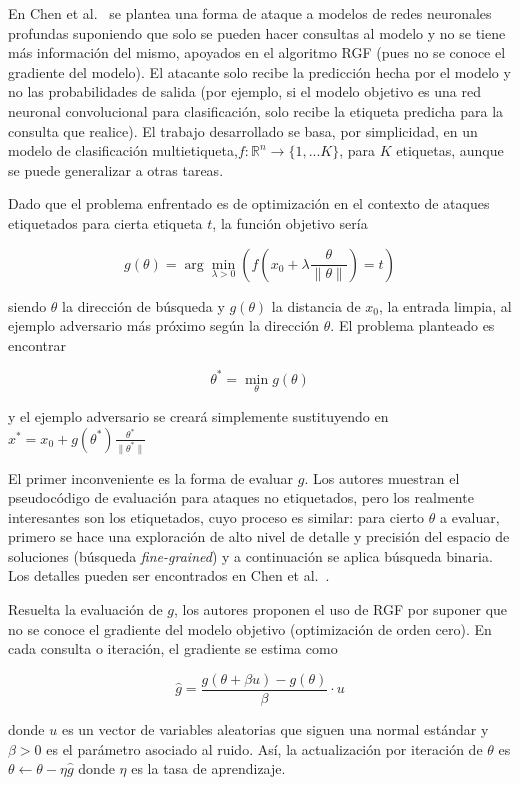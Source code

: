 En Chen et al.~\cite{RGF} se plantea una forma de ataque a modelos de redes neuronales profundas suponiendo que solo se pueden hacer consultas al modelo y no se tiene más información del mismo, apoyados en el algoritmo RGF (pues no se conoce el gradiente del modelo). El atacante solo recibe la predicción hecha por el modelo y no las probabilidades de salida (por ejemplo, si el modelo objetivo es una red neuronal convolucional para clasificación, solo recibe la etiqueta predicha para la consulta que realice). El trabajo desarrollado se basa, por simplicidad, en un modelo de clasificación multietiqueta,$f:\mathbb{R}^n \to \{1,...K\}$, para $K$ etiquetas, aunque se puede generalizar a otras tareas.

Dado que el problema enfrentado es de optimización en el contexto de ataques etiquetados para cierta etiqueta $t$, la función objetivo sería

$$g(\theta) = \arg \min_{\lambda > 0} \left( f(x_0 + \lambda \frac{\theta}{\|\theta\|}) = t \right)$$

siendo $\theta$ la dirección de búsqueda y $g(\theta)$ la distancia de $x_0$, la entrada limpia, al ejemplo adversario más próximo según la dirección $\theta$. El problema planteado es encontrar

$$\theta^* = \min_{\theta} g(\theta)$$

y el ejemplo adversario se creará simplemente sustituyendo en $x^* = x_0 + g(\theta^*) \frac{\theta^*}{\|\theta^*\|}$

El primer inconveniente es la forma de evaluar $g$. Los autores muestran el pseudocódigo de evaluación para ataques no etiquetados, pero los realmente interesantes son los etiquetados, cuyo proceso es similar: para cierto $\theta$ a evaluar, primero se hace una exploración de alto nivel de detalle y precisión del espacio de soluciones (búsqueda \textit{fine-grained}) y a continuación se aplica búsqueda binaria. Los detalles pueden ser encontrados en Chen et al.~\cite{RGF}.

Resuelta la evaluación de $g$, los autores proponen el uso de RGF por suponer que no se conoce el gradiente del modelo objetivo (optimización de orden cero). En cada consulta o iteración, el gradiente se estima como

$$\hat{g} = \frac{g(\theta + \beta u) - g(\theta)}{\beta} \cdot u$$

donde $u$ es un vector de variables aleatorias que siguen una normal estándar y $\beta > 0$ es el parámetro asociado al ruido. Así, la actualización por iteración de $\theta$ es $\theta \gets \theta - \eta \hat{g}$ donde $\eta$ es la tasa de aprendizaje.

